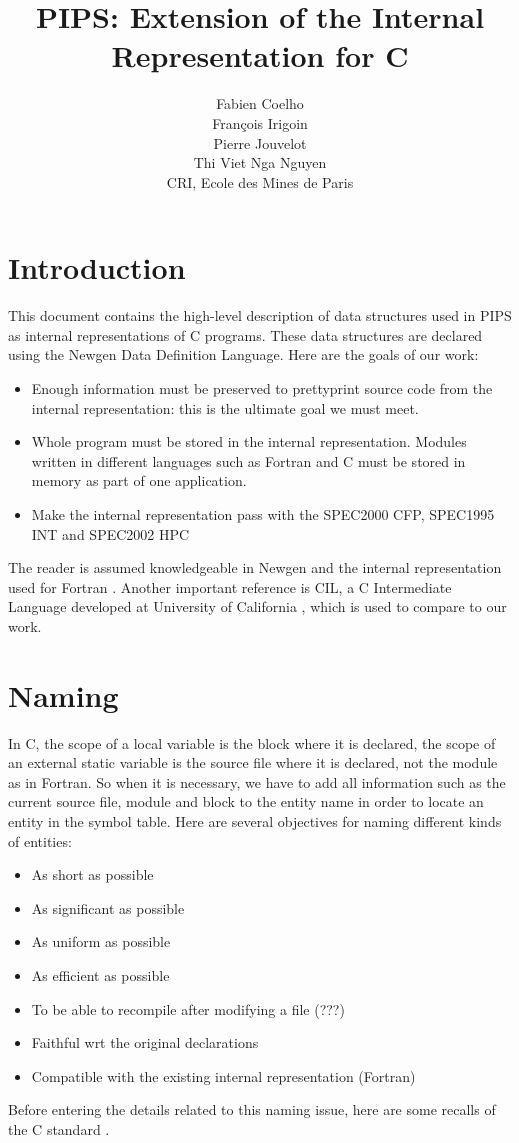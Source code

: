 \documentclass[a4paper]{article}
\title{PIPS: Extension of the Internal Representation for C}
\author{
  Fabien Coelho \\
  Fran\c{c}ois Irigoin \\
  Pierre Jouvelot \\
  Thi Viet Nga Nguyen \\
  CRI, Ecole des Mines de Paris}
\begin{document}
\noindent
\maketitle
\tableofcontents
\newpage
\section*{Introduction}
This document contains the high-level description of data structures
used in PIPS as internal representations of C programs.  These data
structures are declared using the Newgen Data Definition Language. 
Here are the goals of our work:
\begin{itemize}
\item Enough information
must be preserved to prettyprint source code from the internal
representation: this is the ultimate goal we must meet. 
\item Whole program must be stored in the internal representation. Modules written in different languages such as
Fortran and C must be stored in memory as part of one application.
\item Make the internal representation pass with the SPEC2000 CFP, SPEC1995 INT and SPEC2002 HPC
\end{itemize}
The reader is assumed knowledgeable in Newgen \cite{Jouv90} and the internal
representation used for Fortran \cite{Coel01}. Another important reference
is CIL, a C Intermediate Language developed at University of California
\cite{Necu02}, which is used to compare to our work. 
\newpage
\section{Naming}
In C, the scope of a local variable is the
block where it is declared, the scope of an external static variable is
the source file where it is declared, not the module as in Fortran. So when it is
necessary, we have to add all information
such as the current source file, module and block to the entity name in order to locate an
entity in the symbol table. Here are several objectives for naming
different kinds of entities:
\begin{itemize}
\item As short as possible
\item As significant as possible
\item As uniform as possible
\item As efficient as possible
\item To be able to recompile after modifying a file (???)
\item Faithful wrt the original declarations 
\item Compatible with the existing internal representation (Fortran)  
\end{itemize}
Before entering the details related to this naming issue, here are some
recalls of the C standard \cite{ISOC}.
\end{document}
